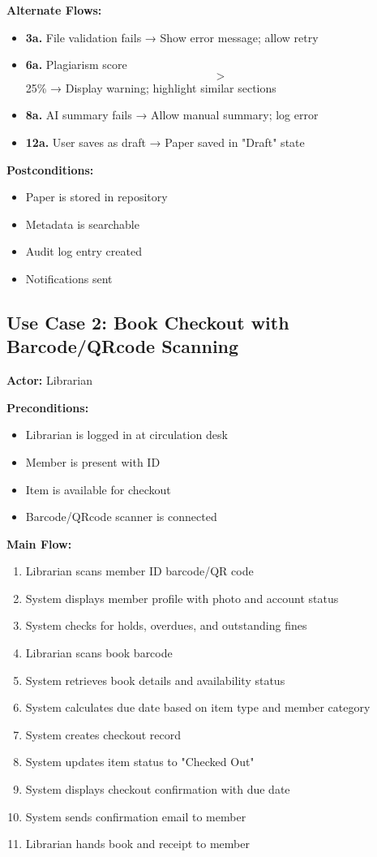 \documentclass[12pt,a4paper]{report}
\begin{document}
\textbf{Alternate Flows:}
\begin{itemize}
    \item \textbf{3a.} File validation fails → Show error message; allow retry
    \item \textbf{6a.} Plagiarism score $$>$$ 25\% → Display warning; highlight similar sections
    \item \textbf{8a.} AI summary fails → Allow manual summary; log error
    \item \textbf{12a.} User saves as draft → Paper saved in "Draft" state
\end{itemize}

\textbf{Postconditions:}
\begin{itemize}
    \item Paper is stored in repository
    \item Metadata is searchable
    \item Audit log entry created
    \item Notifications sent
\end{itemize}

\subsection{Use Case 2: Book Checkout with Barcode/QRcode Scanning}

\textbf{Actor:} Librarian

\textbf{Preconditions:}
\begin{itemize}
    \item Librarian is logged in at circulation desk
    \item Member is present with ID
    \item Item is available for checkout
    \item Barcode/QRcode scanner is connected
\end{itemize}

\textbf{Main Flow:}
\begin{enumerate}
    \item Librarian scans member ID barcode/QR code
    \item System displays member profile with photo and account status
    \item System checks for holds, overdues, and outstanding fines
    \item Librarian scans book barcode
    \item System retrieves book details and availability status
    \item System calculates due date based on item type and member category
    \item System creates checkout record
    \item System updates item status to "Checked Out"
    \item System displays checkout confirmation with due date
    \item System sends confirmation email to member
    \item Librarian hands book and receipt to member
\end{enumerate}
\end{document}
